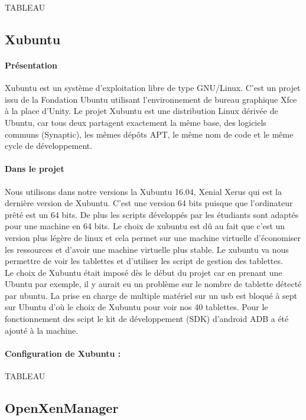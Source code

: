 \documentclass[a4paper,12pt]{extarticle}
\begin{document}
  TABLEAU


\subsection{Xubuntu}
\paragraph{Présentation\\}

Xubuntu est un système d'exploitation libre de type GNU/Linux. C'est un projet issu de la Fondation Ubuntu utilisant l'environnement de bureau graphique Xfce à la place d'Unity. Le projet Xubuntu est une distribution Linux dérivée de Ubuntu, car tous deux partagent exactement la même base, des logiciels communs (Synaptic), les mêmes dépôts APT, le même nom de code et le même cycle de développement.


\paragraph{Dans le projet\\}

Nous utilisons dans notre versions la Xubuntu 16.04, Xenial Xerus qui est la dernière version de Xubuntu. C’est une version 64 bits puisque que l’ordinateur prêté est un 64 bits. De plus les scripts développés par les étudiants sont adaptés pour une machine en 64 bits.
Le choix de xubuntu est dû au fait que c’est un version plus légère de linux et cela permet sur une machine virtuelle d’économiser les ressources et d’avoir une machine virtuelle plus stable.
Le xubuntu va nous permettre de voir les tablettes et d’utiliser les script de gestion des tablettes. \\
Le choix de Xubuntu était imposé dès le début du projet car en prenant une Ubuntu par exemple, il y aurait eu  un problème sur le nombre de tablette détecté par ubuntu. La prise en charge de multiple matériel sur un usb est bloqué à sept sur Ubuntu d'où le choix de Xubuntu pour voir nos 40 tablettes. 
Pour le fonctionnement des scipt le kit de développement (SDK) d’android ADB a été ajouté à la machine.

\paragraph{Configuration de Xubuntu :}

  TABLEAU

\subsection{OpenXenManager}
\end{document}
